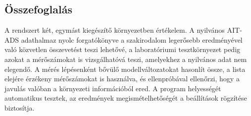 \subsection{Összefoglalás}
A rendszert két, egymást kiegészítő környezetben értékelem. A nyilvános AIT-ADS adathalmaz nyolc forgatókönyve a szakirodalom legerősebb eredményével való közvetlen összevetést teszi lehetővé, a laboratóriumi tesztkörnyezet pedig azokat a mérőszámokat is vizsgálhatóvá teszi, amelyekhez a nyilvános adat nem elegendő. A mérés lépésenként bővülő modellváltozatokat hasonlít össze, a lista elejére érzékeny mérőszámokat is használva, és ellenpróbával ellenőrzi, hogy a javulás valóban a környezeti információból ered. A program helyességét automatikus tesztek, az eredmények megismételhetőségét a beállítások rögzítése biztosítja.